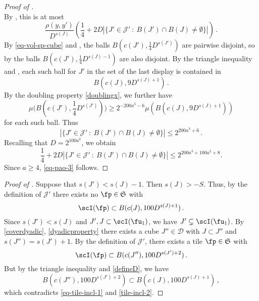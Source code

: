\begin{proof}[Proof of ]
$$        $$
        By , this is at most
        $$
             \frac{\rho(y,y')}{D^{s(J)}} \left( \frac{1}{4} + 2D |\{J' \in \mathcal{J}' \ : \ B(J') \cap B(J) \ne \emptyset\}|\right)\,.
        $$
        By \eqref{eq-vol-sp-cube} and , the balls $B(c(J'), \frac{1}{4} D^{s(J')})$ are pairwise disjoint, so by  the balls $B(c(J'), \frac{1}{4} D^{s(J) - 1})$ are also disjoint. By the triangle inequality and , each such ball for $J'$ in the set of the last display is contained in
        $$
            B(c(J), 9 D^{s(J) + 1})\,.
        $$
        By the doubling property \eqref{doublingx}, we further have
        $$
            \mu\Big(B(c(J'), \frac{1}{4}D^{s(J')})\Big) \ge 2^{-200a^3 - 6} \mu(B(c(J), 9 D^{s(J) + 1}))
        $$
        for each such ball.
        Thus
        $$
            |\{J' \in \mathcal{J}' \ : \ B(J') \cap B(J) \ne \emptyset\}| \le 2^{200a^3 + 6}\,.
        $$
        Recalling that $D=2^{100a^2}$, we obtain
        $$\frac{1}{4} + 2D |\{J' \in \mathcal{J}' \ : \ B(J') \cap B(J) \ne \emptyset\}|\leq 2^{200a^3 + 100a^2+ 8}.$$
        Since $a\ge 4$, \eqref{eq-pao-3} follows.
    \end{proof}

    \begin{proof}[Proof of ]
        Suppose that $s(J') < s(J) - 1$. Then $s(J) > -S$. Thus, by the definition of $\mathcal{J}'$ there exists no $\fp \in \mathfrak{S}$ with
        \begin{equation}
            \label{eq-tile-incl-1}
            \scI(\fp) \subset B(c(J), 100D^{s(J) + 1})\,.
        \end{equation}
        Since $s(J') < s(J)$ and $J', J \subset \scI(\fu_1)$, we have $J' \subsetneq \scI(\fu_1)$.
        By \eqref{coverdyadic}, \eqref{dyadicproperty} there exists a cube $J'' \in \mathcal{D}$ with $J \subset J''$ and $s(J'') = s(J') + 1$. By the definition of $\mathcal{J}'$, there exists a tile $\fp \in \mathfrak{S}$ with
        \begin{equation}
            \label{tile-incl-2}
            \scI(\fp) \subset B(c(J''), 100 D^{s(J')+2})\,.
        \end{equation}
        But by the triangle inequality and \eqref{defineD}, we have
        $$
            B(c(J''), 100 D^{s(J')+2}) \subset B(c(J), 100D^{s(J) + 1})\,,
        $$
        which contradicts \eqref{eq-tile-incl-1} and \eqref{tile-incl-2}.
    \end{proof}


